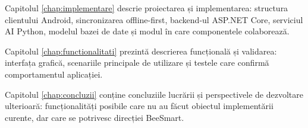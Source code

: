Capitolul \ref{chap:implementare} descrie proiectarea și implementarea: structura clientului Android, sincronizarea offline-first, backend-ul ASP.NET Core, serviciul AI Python, modelul bazei de date și modul în care componentele colaborează.

Capitolul \ref{chap:functionalitati} prezintă descrierea funcțională și validarea: interfața grafică, scenariile principale de utilizare și testele care confirmă comportamentul aplicației.

Capitolul \ref{chap:concluzii} conține concluziile lucrării și perspectivele de dezvoltare ulterioară: funcționalități posibile care nu au făcut obiectul implementării curente, dar care se potrivesc direcției BeeSmart.
